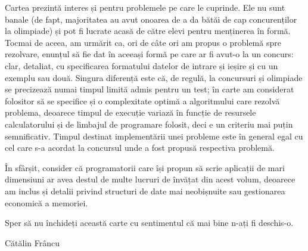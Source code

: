Cartea prezintă interes și pentru problemele pe care le cuprinde. Ele nu sunt
banale (de fapt, majoritatea au avut onoarea de a da bătăi de cap
concurenților la olimpiade) și pot fi lucrate acasă de către elevi pentru
menținerea în formă. Tocmai de aceea, am urmărit ca, ori de câte ori am propus
o problemă spre rezolvare, enunțul să fie dat în aceeași formă pe care ar fi
avut-o la un concurs: clar, detaliat, cu specificarea formatului datelor de
intrare și ieșire și cu un exemplu sau două. Singura diferență este că, de
regulă, la concursuri și olimpiade se precizează numai timpul limită admis
pentru un test; în carte am considerat folositor să se specifice și o
complexitate optimă a algoritmului care rezolvă problema, deoarece timpul de
execuție variază în funcție de resursele calculatorului și de limbajul de
programare folosit, deci e un criteriu mai puțin semnificativ. Timpul destinat
implementării unei probleme este în general egal cu cel care s-a acordat la
concursul unde a fost propusă respectiva problemă.

În sfârșit, consider că programatorii care își propun să scrie aplicații de
mari dimensiuni ar avea destul de multe lucruri de învățat din acest volum,
deoarece am inclus și detalii privind structuri de date mai neobișnuite sau
gestionarea economică a memoriei.

Sper să nu închideți această carte cu sentimentul că mai bine n-ați fi
deschis-o.

\begin{flushright}
  Cătălin Frâncu
\end{flushright}
